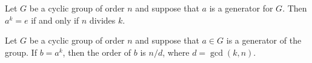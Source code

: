 \documentclass[11pt]{article} %
\newcommand\br{\vspace{15 pt}}
\begin{document}
\br

\theorem{}
{Let $G$ be a cyclic group of order $n$ and suppose that $a$ is a generator for $G$. Then $a^k = e$ if and only if $n$ divides $k$.}
{}

\br

\theorem{}
{Let $G$ be a cyclic group of order $n$ and suppose that $a \in G$ is a generator of the group. If $b = a^k$, then the order of $b$ is $n/d$, where $d = \gcd (k,n)$.
}
{}
\end{document}

